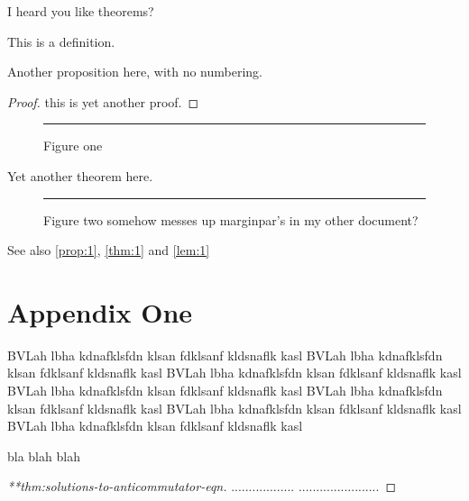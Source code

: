 \documentclass[%
  aps,%
  pra,%
  superscriptaddress,%
  reprint,%
  longbibliography,%
  nofootinbib,%
  notitlepage]{revtex4-2}
\begin{document}
\begin{theorem}
\noproofref
\label{thm:2}
I heard you like theorems?
\end{theorem}

\begin{definition*}
This is a definition.
\end{definition*}


\begin{proposition*}
Another proposition here, with no numbering.
\end{proposition*}
\begin{proof}
  this is yet another proof.
\end{proof}


\begin{figure}
\centering
\rule{4cm}{6cm}
\caption{Figure one}
\end{figure}

\begin{theorem}
  \label{thm:another}
  Yet another theorem here.
\end{theorem}


\begin{figure}
\centering
\rule{5cm}{5cm}
\caption{Figure two somehow messes up marginpar's in my other document?}
\end{figure}

See also \autoref{prop:1}, \autoref{thm:1} and \autoref{lem:1}

\clearpage
{}
\onecolumngrid

\appendix
\section{Appendix One}


\begin{proposition}
  \label{thm:solutions-to-anticommutator-eqn}
  BVLah lbha kdnafklsfdn klsan fdklsanf kldsnaflk kasl BVLah lbha kdnafklsfdn
  klsan fdklsanf kldsnaflk kasl BVLah lbha kdnafklsfdn klsan fdklsanf kldsnaflk
  kasl BVLah lbha kdnafklsfdn klsan fdklsanf kldsnaflk kasl BVLah lbha
  kdnafklsfdn klsan fdklsanf kldsnaflk kasl BVLah lbha kdnafklsfdn klsan
  fdklsanf kldsnaflk kasl BVLah lbha kdnafklsfdn klsan fdklsanf kldsnaflk kasl
\end{proposition}

bla blah blah

\begin{proof}[**thm:solutions-to-anticommutator-eqn]
  .................. ....................... 
\end{proof}
\end{document}

